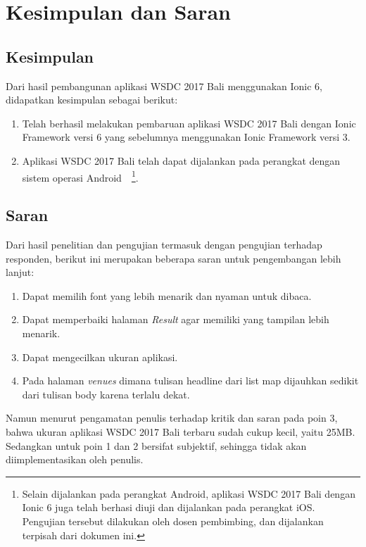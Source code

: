 \chapter{Kesimpulan dan Saran}
\label{chap:kesimpulanSaran}

\section{Kesimpulan} 
\label{sec:kesimpulan}

Dari hasil pembangunan aplikasi WSDC 2017 Bali menggunakan Ionic 6, didapatkan kesimpulan sebagai berikut:

\begin{enumerate}
	\item Telah berhasil melakukan pembaruan aplikasi WSDC 2017 Bali dengan Ionic Framework versi 6 yang sebelumnya menggunakan Ionic Framework versi 3.
	\item Aplikasi WSDC 2017 Bali telah dapat dijalankan pada perangkat dengan sistem operasi Android~~\footnote{Selain dijalankan pada perangkat Android, aplikasi WSDC 2017 Bali dengan Ionic 6 juga telah berhasi diuji dan dijalankan pada perangkat iOS. Pengujian tersebut dilakukan oleh dosen pembimbing, dan dijalankan terpisah dari dokumen ini.}.
\end{enumerate}

\section{Saran} 
\label{sec:saran}

Dari hasil penelitian dan pengujian termasuk dengan pengujian terhadap responden, berikut ini merupakan beberapa saran untuk pengembangan lebih lanjut:

\begin{enumerate}
	\item Dapat memilih font yang lebih menarik dan nyaman untuk dibaca.
	\item Dapat memperbaiki halaman \textit{Result} agar memiliki yang tampilan lebih menarik.
	\item Dapat mengecilkan ukuran aplikasi.
	\item Pada halaman \textit{venues} dimana tulisan headline dari list map dijauhkan sedikit dari tulisan body karena terlalu dekat.
\end{enumerate}
	Namun menurut pengamatan penulis terhadap kritik dan saran pada poin 3, bahwa ukuran aplikasi WSDC 2017 Bali terbaru sudah cukup kecil, yaitu 25MB. Sedangkan untuk poin 1 dan 2 bersifat subjektif, sehingga tidak akan diimplementasikan oleh penulis.